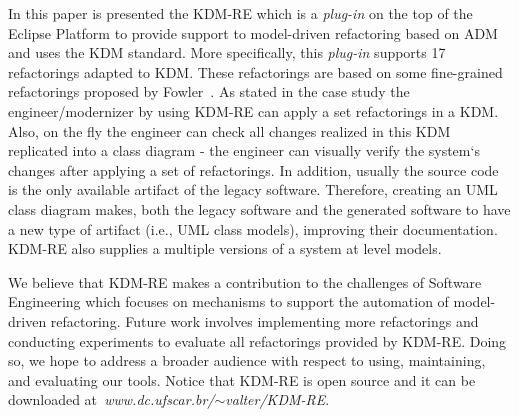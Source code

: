 In this paper is presented the KDM-RE which is a \textit{plug-in} on the top of the Eclipse Platform to provide support to model-driven refactoring based on ADM and uses the KDM standard. More specifically, this \textit{plug-in} supports 17 refactorings adapted to KDM. These refactorings are based on some fine-grained refactorings proposed by Fowler~\cite{refactImpro}. As stated in the case study the engineer/modernizer by using KDM-RE can apply a set refactorings in a KDM. Also, on the fly the engineer can check all changes realized in this KDM replicated into a class diagram - the engineer can visually verify the system`s changes after applying a set of refactorings. In addition, usually the source code is the only available artifact of the legacy software. 
Therefore, creating an UML class diagram makes, both the legacy software and the generated software to have a new type of artifact (i.e., UML class models), improving their documentation. KDM-RE also supplies a multiple versions of a system at level models.



We believe that KDM-RE makes a contribution to the challenges of Software Engineering which focuses on mechanisms to support the automation of model-driven refactoring. Future work involves implementing more refactorings and conducting experiments to evaluate all refactorings provided by KDM-RE. Doing so, we hope to address a broader
audience with respect to using, maintaining, and evaluating
our tools. Notice that KDM-RE is open source and it can be downloaded at\textit{~www.dc.ufscar.br/$\sim$valter/KDM-RE}.